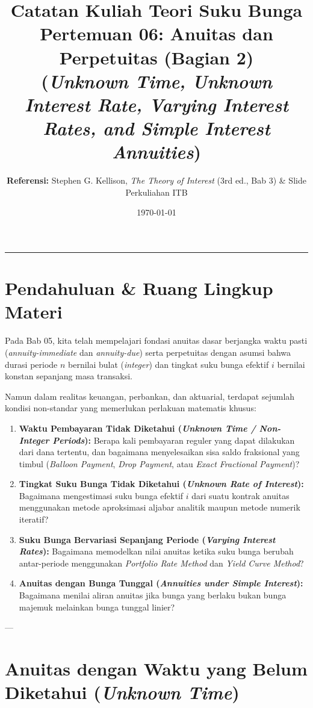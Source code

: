 \documentclass[11pt,a4paper]{article}
\title{\textbf{\LARGE Catatan Kuliah Teori Suku Bunga}\\[0.3em]
\Large Pertemuan 06: Anuitas dan Perpetuitas (Bagian 2)\\
\large (\textit{Unknown Time, Unknown Interest Rate, Varying Interest Rates, and Simple Interest Annuities})}
\author{\textbf{Referensi:} Stephen G. Kellison, \textit{The Theory of Interest} (3rd ed., Bab 3) \& Slide Perkuliahan ITB}
\date{\today}
\begin{document}
\maketitle
\tableofcontents
\vspace{1em}
\noindent\rule{\textwidth}{0.4pt}
\vspace{1.5em}

\section{Pendahuluan \& Ruang Lingkup Materi}

Pada Bab 05, kita telah mempelajari fondasi anuitas dasar berjangka waktu pasti (\textit{annuity-immediate} dan \textit{annuity-due}) serta perpetuitas dengan asumsi bahwa durasi periode $n$ bernilai bulat (\textit{integer}) dan tingkat suku bunga efektif $i$ bernilai konstan sepanjang masa transaksi.

Namun dalam realitas keuangan, perbankan, dan aktuarial, terdapat sejumlah kondisi non-standar yang memerlukan perlakuan matematis khusus:
\begin{enumerate}[label=\textbf{\arabic*.}]
    \item \textbf{Waktu Pembayaran Tidak Diketahui (\textit{Unknown Time / Non-Integer Periods}):} Berapa kali pembayaran reguler yang dapat dilakukan dari dana tertentu, dan bagaimana menyelesaikan sisa saldo fraksional yang timbul (\textit{Balloon Payment}, \textit{Drop Payment}, atau \textit{Exact Fractional Payment})?
    \item \textbf{Tingkat Suku Bunga Tidak Diketahui (\textit{Unknown Rate of Interest}):} Bagaimana mengestimasi suku bunga efektif $i$ dari suatu kontrak anuitas menggunakan metode aproksimasi aljabar analitik maupun metode numerik iteratif?
    \item \textbf{Suku Bunga Bervariasi Sepanjang Periode (\textit{Varying Interest Rates}):} Bagaimana memodelkan nilai anuitas ketika suku bunga berubah antar-periode menggunakan \textit{Portfolio Rate Method} dan \textit{Yield Curve Method}?
    \item \textbf{Anuitas dengan Bunga Tunggal (\textit{Annuities under Simple Interest}):} Bagaimana menilai aliran anuitas jika bunga yang berlaku bukan bunga majemuk melainkan bunga tunggal linier?
\end{enumerate}

---

\section{Anuitas dengan Waktu yang Belum Diketahui (\textit{Unknown Time})}
\end{document}
